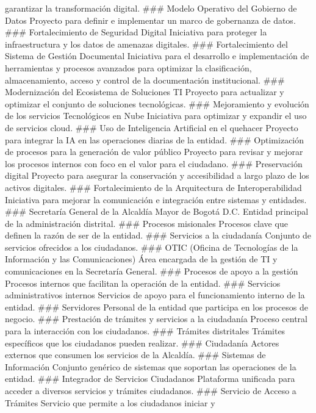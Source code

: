 \documentclass[
	a4paper, %
	12pt, %
]{include/CSSullivanBusinessReport}
\begin{document}
garantizar la transformación digital. \#\#\# Modelo Operativo del
Gobierno de Datos Proyecto para definir e implementar un marco de
gobernanza de datos. \#\#\# Fortalecimiento de Seguridad Digital
Iniciativa para proteger la infraestructura y los datos de amenazas
digitales. \#\#\# Fortalecimiento del Sistema de Gestión Documental
Iniciativa para el desarrollo e implementación de herramientas y
procesos avanzados para optimizar la clasificación, almacenamiento,
acceso y control de la documentación institucional. \#\#\# Modernización
del Ecosistema de Soluciones TI Proyecto para actualizar y optimizar el
conjunto de soluciones tecnológicas. \#\#\# Mejoramiento y evolución de
los servicios Tecnológicos en Nube Iniciativa para optimizar y expandir
el uso de servicios cloud. \#\#\# Uso de Inteligencia Artificial en el
quehacer Proyecto para integrar la IA en las operaciones diarias de la
entidad. \#\#\# Optimización de procesos para la generación de valor
público Proyecto para revisar y mejorar los procesos internos con foco
en el valor para el ciudadano. \#\#\# Preservación digital Proyecto para
asegurar la conservación y accesibilidad a largo plazo de los activos
digitales. \#\#\# Fortalecimiento de la Arquitectura de
Interoperabilidad Iniciativa para mejorar la comunicación e integración
entre sistemas y entidades. \#\#\# Secretaría General de la Alcaldía
Mayor de Bogotá D.C. Entidad principal de la administración distrital.
\#\#\# Procesos misionales Procesos clave que definen la razón de ser de
la entidad. \#\#\# Servicios a la ciudadanía Conjunto de servicios
ofrecidos a los ciudadanos. \#\#\# OTIC (Oficina de Tecnologías de la
Información y las Comunicaciones) Área encargada de la gestión de TI y
comunicaciones en la Secretaría General. \#\#\# Procesos de apoyo a la
gestión Procesos internos que facilitan la operación de la entidad.
\#\#\# Servicios administrativos internos Servicios de apoyo para el
funcionamiento interno de la entidad. \#\#\# Servidores Personal de la
entidad que participa en los procesos de negocio. \#\#\# Prestación de
trámites y servicios a la ciudadanía Proceso central para la interacción
con los ciudadanos. \#\#\# Trámites distritales Trámites específicos que
los ciudadanos pueden realizar. \#\#\# Ciudadanía Actores externos que
consumen los servicios de la Alcaldía. \#\#\# Sistemas de Información
Conjunto genérico de sistemas que soportan las operaciones de la
entidad. \#\#\# Integrador de Servicios Ciudadanos Plataforma unificada
para acceder a diversos servicios y trámites ciudadanos. \#\#\# Servicio
de Acceso a Trámites Servicio que permite a los ciudadanos iniciar y
\end{document}
